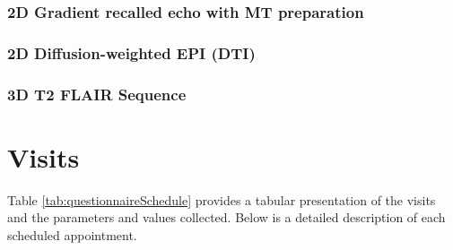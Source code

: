 \subsubsection{2D Gradient recalled echo with MT preparation}

\subsubsection{2D Diffusion-weighted EPI (\acf{DTI})}

\subsubsection{3D T2 \ac{FLAIR} Sequence}

\section{Visits}
Table \ref{tab:questionnaireSchedule} provides a tabular presentation of the visits and the parameters and values collected. Below is a detailed description of each scheduled appointment.


